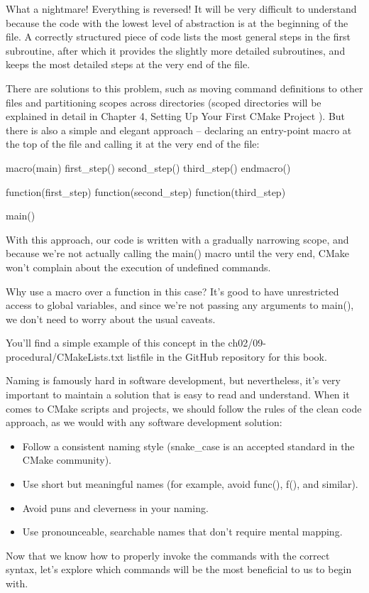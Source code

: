 What a nightmare! Everything is reversed! It will be very difficult to understand because the code with the lowest level of abstraction is at the beginning of the file. A correctly structured piece of code lists the most general steps in the first subroutine, after which it provides the slightly more detailed subroutines, and keeps the most detailed steps at the very end of the file.

There are solutions to this problem, such as moving command definitions to other files and partitioning scopes across directories (scoped directories will be explained in detail in Chapter 4, Setting Up Your First CMake Project ). But there is also a simple and elegant approach – declaring an entry-point macro at the top of the file and calling it at the very end of the file:

\begin{cmake}
macro(main)
    first_step()
    second_step()
    third_step()
endmacro()

function(first_step)
function(second_step)
function(third_step)

main()
\end{cmake}

With this approach, our code is written with a gradually narrowing scope, and because we’re not actually calling the main() macro until the very end, CMake won’t complain about the execution of undefined commands.

Why use a macro over a function in this case? It’s good to have unrestricted access to global variables, and since we’re not passing any arguments to main(), we don’t need to worry about the usual caveats.

You’ll find a simple example of this concept in the ch02/09-procedural/CMakeLists.txt listfile in the GitHub repository for this book.


Naming is famously hard in software development, but nevertheless, it’s very important to maintain a solution that is easy to read and understand. When it comes to CMake scripts and projects, we should follow the rules of the clean code approach, as we would with any software development solution:

\begin{itemize}
\item
Follow a consistent naming style (snake\_case is an accepted standard in the CMake community).

\item
Use short but meaningful names (for example, avoid func(), f(), and similar).

\item
Avoid puns and cleverness in your naming.

\item
Use pronounceable, searchable names that don’t require mental mapping.
\end{itemize}

Now that we know how to properly invoke the commands with the correct syntax, let’s explore which commands will be the most beneficial to us to begin with.



















